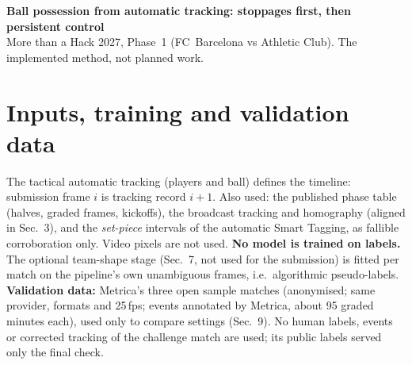 \documentclass[10pt,a4paper]{article}
\begin{document}
{\large\bfseries Ball possession from automatic tracking: stoppages first, then persistent control}\\[1pt]
{\small More than a Hack 2027, Phase~1 (FC~Barcelona vs Athletic Club). The implemented method, not planned work.}

\section{Inputs, training and validation data}
The tactical automatic tracking (players and ball) defines the timeline: submission frame $i$ is tracking record $i{+}1$. Also
used: the published phase table (halves, graded frames, kickoffs), the broadcast tracking and homography (aligned in Sec.~3), and
the \emph{set-piece} intervals of the automatic Smart Tagging, as fallible corroboration only. Video pixels are not used.
\textbf{No model is trained on labels.} The optional team-shape stage (Sec.~7, not used for the submission) is fitted per match
on the pipeline's own unambiguous frames, i.e.\ algorithmic pseudo-labels. \textbf{Validation data:} Metrica's three open sample
matches (anonymised; same provider, formats and 25\,fps; events annotated by Metrica, about 95 graded minutes each), used only to
compare settings (Sec.~9). No human labels, events or corrected tracking of the challenge match are used; its public labels
served only the final check.
\end{document}
